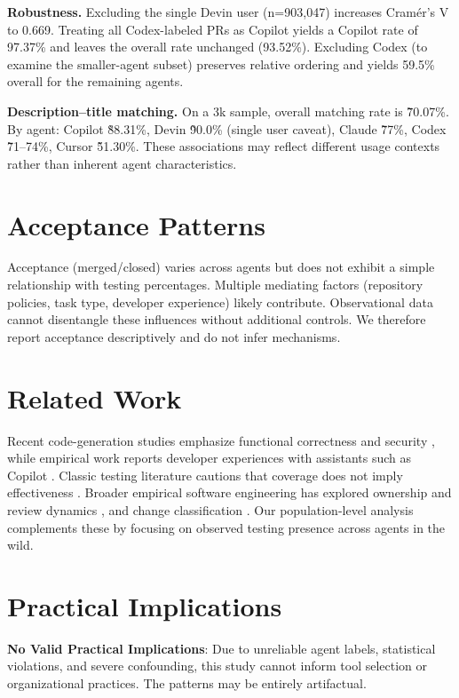 \documentclass[conference]{IEEEtran}
\begin{document}
\textbf{Robustness.} Excluding the single Devin user (n=903{,}047) increases Cramér's V to 0.669. Treating all Codex-labeled PRs as Copilot yields a Copilot rate of 97.37\% and leaves the overall rate unchanged (93.52\%). Excluding Codex (to examine the smaller-agent subset) preserves relative ordering and yields 59.5\% overall for the remaining agents.

\textbf{Description--title matching.} On a 3k sample, overall matching rate is \~70.07\%. By agent: Copilot \~88.31\%, Devin \~90.0\% (single user caveat), Claude \~77\%, Codex \~71--74\%, Cursor \~51.30\%. These associations may reflect different usage contexts rather than inherent agent characteristics.

\section{Acceptance Patterns}
Acceptance (merged/closed) varies across agents but does not exhibit a simple relationship with testing percentages. Multiple mediating factors (repository policies, task type, developer experience) likely contribute. Observational data cannot disentangle these influences without additional controls. We therefore report acceptance descriptively and do not infer mechanisms.

\section{Related Work}
Recent code-generation studies emphasize functional correctness and security \cite{chen2021evaluating}, while empirical work reports developer experiences with assistants such as Copilot \cite{bareiss2023code}. Classic testing literature cautions that coverage does not imply effectiveness \cite{inozemtseva2014coverage}. Broader empirical software engineering has explored ownership and review dynamics \cite{bird2011dont,bacchelli2013expectations}, and change classification \cite{kim2008classifying}. Our population-level analysis complements these by focusing on observed testing presence across agents in the wild.

\section{Practical Implications}
\textbf{No Valid Practical Implications}: Due to unreliable agent labels, statistical violations, and severe confounding, this study cannot inform tool selection or organizational practices. The patterns may be entirely artifactual.
\end{document}
